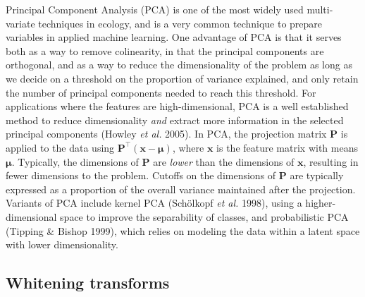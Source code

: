 \documentclass[
  letterpaper,
]{scrbook}
\begin{document}
Principal Component Analysis (PCA) is one of the most widely used
multi-variate techniques in ecology, and is a very common technique to
prepare variables in applied machine learning. One advantage of PCA is
that it serves both as a way to remove colinearity, in that the
principal components are orthogonal, and as a way to reduce the
dimensionality of the problem as long as we decide on a threshold on the
proportion of variance explained, and only retain the number of
principal components needed to reach this threshold. For applications
where the features are high-dimensional, PCA is a well established
method to reduce dimensionality \emph{and} extract more information in
the selected principal components (Howley \emph{et al.} 2005). In PCA,
the projection matrix \(\mathbf{P}\) is applied to the data using
\(\mathbf{P}^\top(\mathbf{x}-\mathbf{\mu})\), where \(\mathbf{x}\) is
the feature matrix with means \(\mathbf{\mu}\). Typically, the
dimensions of \(\mathbf{P}\) are \emph{lower} than the dimensions of
\(\mathbf{x}\), resulting in fewer dimensions to the problem. Cutoffs on
the dimensions of \(\mathbf{P}\) are typically expressed as a proportion
of the overall variance maintained after the projection. Variants of PCA
include kernel PCA (Schölkopf \emph{et al.} 1998), using a
higher-dimensional space to improve the separability of classes, and
probabilistic PCA (Tipping \& Bishop 1999), which relies on modeling the
data within a latent space with lower dimensionality.

\subsection{Whitening transforms}\label{whitening-transforms}
\end{document}
